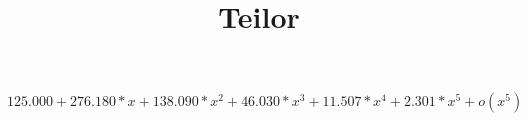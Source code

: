 \documentclass[a4paper, 12pt]{article}
\title{Teilor}
\begin{document}
\maketitle 
${125.000}+{276.180}*x+{138.090}*x^2+{46.030}*x^3+{11.507}*x^4+{2.301}*x^5+o(x^5)$
\end{document}
